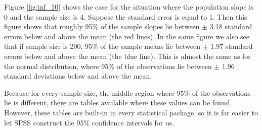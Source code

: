 \documentclass[]{report}\usepackage[]{graphicx}\usepackage[]{color}
\begin{document}

Figure \ref{fig:inf_10} shows the case for the situation where the population slope is 0 and the sample size is 4. Suppose the standard error is equal to 1. Then this figure shows that roughly 95\% of the sample slopes lie between $\pm$ 3.18 standard errors below and above the mean (the red lines). In the same figure we also see that if sample size is 200, 95\% of the sample means lie between $\pm$ 1.97 standard errors below and above the mean (the blue line). This is almost the same as for the normal distribution, where 95\% of the observations lie between $\pm$ 1.96 standard deviations below and above the mean.

Because for every sample size, the middle region where 95\% of the observations lie is different, there are tables available where these values can be found. However, these tables are built-in in every statistical package, so it is far easier to let SPSS construct the 95\% confidence intervals for us.
\end{document}

